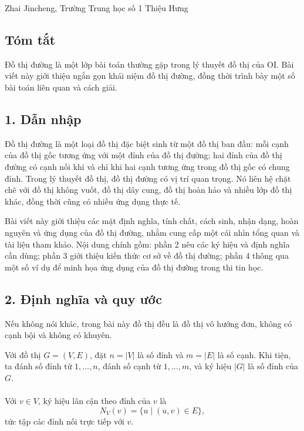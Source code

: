 \documentclass[11pt]{article}
\begin{document}
\begin{center}
Zhai Jincheng, Trường Trung học số 1 Thiệu Hưng
\end{center}

\subsection*{Tóm tắt}

Đồ thị đường là một lớp bài toán thường gặp trong lý thuyết đồ thị của OI. Bài
viết này giới thiệu ngắn gọn khái niệm đồ thị đường, đồng thời trình bày một số
bài toán liên quan và cách giải.

\subsection*{1. Dẫn nhập}

Đồ thị đường là một loại đồ thị đặc biệt sinh từ một đồ thị ban đầu: mỗi cạnh
của đồ thị gốc tương ứng với một đỉnh của đồ thị đường; hai đỉnh của đồ thị
đường có cạnh nối khi và chỉ khi hai cạnh tương ứng trong đồ thị gốc có chung
đỉnh. Trong lý thuyết đồ thị, đồ thị đường có vị trí quan trọng. Nó liên hệ
chặt chẽ với đồ thị không vuốt, đồ thị dây cung, đồ thị hoàn hảo và nhiều lớp
đồ thị khác, đồng thời cũng có nhiều ứng dụng thực tế.

Bài viết này giới thiệu các mặt định nghĩa, tính chất, cách sinh, nhận dạng,
hoàn nguyên và ứng dụng của đồ thị đường, nhằm cung cấp một cái nhìn tổng quan
và tài liệu tham khảo. Nội dung chính gồm: phần 2 nêu các ký hiệu và định nghĩa
cần dùng; phần 3 giới thiệu kiến thức cơ sở về đồ thị đường; phần 4 thông qua
một số ví dụ để minh họa ứng dụng của đồ thị đường trong thi tin học.

\subsection*{2. Định nghĩa và quy ước}

Nếu không nói khác, trong bài này đồ thị đều là đồ thị vô hướng đơn, không có
cạnh bội và không có khuyên.

Với đồ thị \(G=(V,E)\), đặt \(n=|V|\) là số đỉnh và \(m=|E|\) là số cạnh. Khi
tiện, ta đánh số đỉnh từ \(1,\ldots,n\), đánh số cạnh từ \(1,\ldots,m\), và ký
hiệu \(|G|\) là số đỉnh của \(G\).

\paragraph{}
Với \(v\in V\), ký hiệu lân cận theo đỉnh của \(v\) là
\[
  N_V(v)=\{u\mid (u,v)\in E\},
\]
tức tập các đỉnh nối trực tiếp với \(v\).
\end{document}
